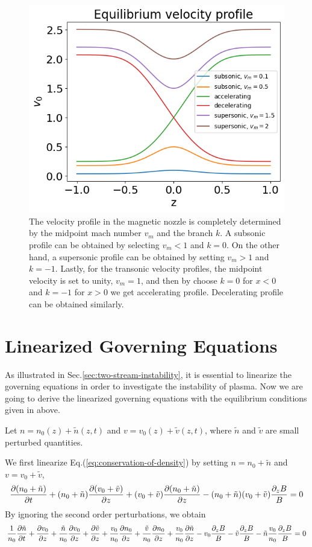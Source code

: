 \begin{figure}[H]
	\centering
	\includegraphics[width=0.7\linewidth]{figures/velocity-profiles}
	\caption{The velocity profile in the magnetic nozzle is completely determined by the midpoint mach number $v_m$ and the branch $k$. A subsonic profile can be obtained by selecting $v_m<1$ and $k=0$. On the other hand, a supersonic profile can be obtained by setting $v_m>1$ and $k=-1$. Lastly, for the transonic velocity profiles, the midpoint velocity is set to unity, $v_m=1$, and then by choose $k=0$ for $x<0$ and $k=-1$ for $x>0$ we get accelerating profile. Decelerating profile can be obtained similarly.}
	\label{fig:velocity-profiles}
\end{figure}

\section{Linearized Governing Equations}
As illustrated in Sec.\ref{sec:two-stream-instability}, it is essential to linearize the governing equations in order to investigate the instability of plasma. Now we are going to derive the linearized governing equations with the equilibrium conditions given in above.

Let $n = n_0(z) + \tilde{n}(z,t)$ and $v = v_0(z) + \tilde{v}(z,t)$, where $\tilde{n}$ and $\tilde{v}$ are small perturbed quantities.

We first linearize Eq.(\ref{eq:conservation-of-density}) by setting $n=n_0+\tilde{n}$ and $v=v_0+\tilde{v}$,
\[    \pdv{(n_0+\tilde{n})}{t}
	+ (n_0+\tilde{n})\pdv{(v_0+\tilde{v})}{z}
	+ (v_0+\tilde{v})\pdv{(n_0+\tilde{n})}{z}
	- (n_0+\tilde{n})(v_0+\tilde{v})\frac{\partial_z B}{B} = 0
\]
By ignoring the second order perturbations, we obtain
\[ \frac{1}{n_0}\pdv{\tilde{n}}{t}
	+ \pdv{v_0}{z} + \frac{\tilde{n}}{n_0}\pdv{v_0}{z} + \pdv{\tilde{v}}{z}
	+ \frac{v_0}{n_0}\pdv{n_0}{z} + \frac{\tilde{v}}{n_0}\pdv{n_0}{z} + \frac{v_0}{n_0}\pdv{\tilde{n}}{z}
	- v_0\frac{\partial_z B}{B} - \tilde{v}\frac{\partial_z B}{B} - \tilde{n}\frac{v_0}{n_0}\frac{\partial_z B}{B} = 0
\]


